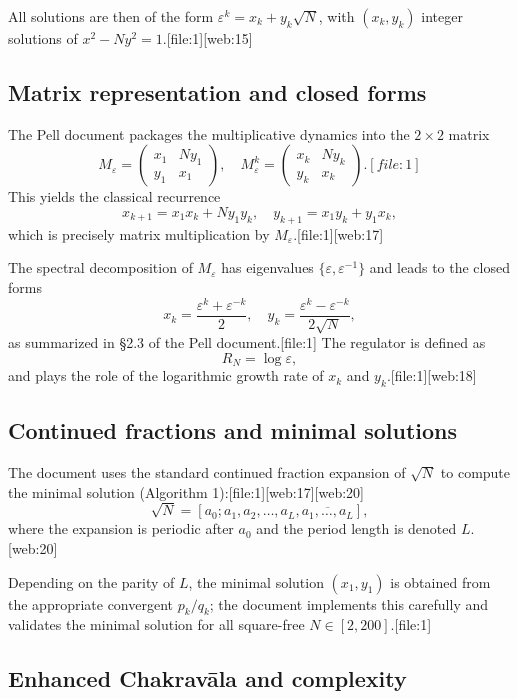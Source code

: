 \documentclass[11pt]{article}
\begin{document}
All solutions are then of the form \(\varepsilon^k = x_k + y_k\sqrt{N}\),
with \((x_k, y_k)\) integer solutions of \(x^2 - Ny^2 = 1\).[file:1][web:15]

\subsection{Matrix representation and closed forms}

The Pell document packages the multiplicative dynamics into the
\(2 \times 2\) matrix
\[
M_\varepsilon =
\begin{pmatrix}
  x_1 & N y_1 \\
  y_1 & x_1
\end{pmatrix},
\quad
M_\varepsilon^k =
\begin{pmatrix}
  x_k & N y_k \\
  y_k & x_k
\end{pmatrix}.[file:1]
\]
This yields the classical recurrence
\[
x_{k+1} = x_1 x_k + N y_1 y_k,\quad
y_{k+1} = x_1 y_k + y_1 x_k,
\]
which is precisely matrix multiplication by \(M_\varepsilon\).[file:1][web:17]

The spectral decomposition of \(M_\varepsilon\) has eigenvalues
\(\{\varepsilon,\varepsilon^{-1}\}\) and leads to the closed forms
\[
x_k = \frac{\varepsilon^k + \varepsilon^{-k}}{2}, \quad
y_k = \frac{\varepsilon^k - \varepsilon^{-k}}{2\sqrt{N}},
\]
as summarized in §2.3 of the Pell document.[file:1] The regulator is
defined as
\[
R_N = \log \varepsilon,
\]
and plays the role of the logarithmic growth rate of \(x_k\) and \(y_k\).[file:1][web:18]

\subsection{Continued fractions and minimal solutions}

The document uses the standard continued fraction expansion of
\(\sqrt{N}\) to compute the minimal solution (Algorithm 1):[file:1][web:17][web:20]
\[
\sqrt{N} = [a_0; a_1, a_2, \dots, a_L, \overline{a_1, \dots,a_L}],
\]
where the expansion is periodic after \(a_0\) and the period length is
denoted \(L\).[web:20]

Depending on the parity of \(L\), the minimal solution \((x_1,y_1)\) is
obtained from the appropriate convergent \(p_k / q_k\); the document
implements this carefully and validates the minimal solution for all
square-free \(N \in [2,200]\).[file:1]

\subsection{Enhanced Chakrav\=ala and complexity}
\end{document}
